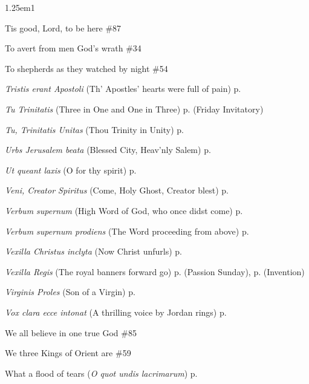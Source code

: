 \begin{hangparas}{1.25em}{1}
\par\noindent
Tis good, Lord, to be here \dotfill \#87
\par\noindent
To avert from men God's wrath \dotfill \#34
\par\noindent
To shepherds as they watched by night \dotfill \#54
\par\noindent
\textit{Tristis erant Apostoli} (Th' Apostles' hearts were full of pain) \dotfill p. \pageref{ApostlesEvensongEaster}
\par\noindent
\textit{Tu Trinitatis} (Three in One and One in Three) \dotfill p. \pageref{FridayInvitatory} (Friday Invitatory)
\par\noindent
\textit{Tu, Trinitatis Unitas} (Thou Trinity in Unity) \dotfill p. \pageref{TrinityMattins}
\par\noindent
\textit{Urbs Jerusalem beata} (Blessed City, Heav'nly Salem) \dotfill p. \pageref{DedicationEvensong}
\par\noindent
\textit{Ut queant laxis} (O for thy spirit) \dotfill p. \pageref{JohnBaptistEvensong}
\par\noindent
\textit{Veni, Creator Spiritus} (Come, Holy Ghost, Creator blest) \dotfill p. \pageref{WhitsundayEvensongHymn}
\par\noindent
\textit{Verbum supernum} (High Word of God, who once didst come) \dotfill p. \pageref{FirstAdventInvitatory}
\par\noindent
\textit{Verbum supernum prodiens} (The Word proceeding from above) \dotfill p. \pageref{CorpusChristiMattins}
\par\noindent
\textit{Vexilla Christus inclyta} (Now Christ unfurls) \dotfill p. \pageref{ChristTheKingMattins}
\par\noindent
\textit{Vexilla Regis} (The royal banners forward go) \dotfill p. \pageref{PassionSundayEvensong} (Passion Sunday), p. \pageref{InventionEvensong} (Invention)
\par\noindent
\textit{Virginis Proles} (Son of a Virgin) \dotfill p. \pageref{VirginInvitatory}
\par\noindent
\textit{Vox clara ecce intonat} (A thrilling voice by Jordan rings) \dotfill p. \pageref{FirstAdventMattins}
\par\noindent
We all believe in one true God \dotfill \#85
\par\noindent
We three Kings of Orient are \dotfill \#59
\par\noindent
What a flood of tears (\textit{O quot undis lacrimarum}) \dotfill p. \pageref{SevenSorrowsInvitatory}
\par\noindent

\end{hangparas}
